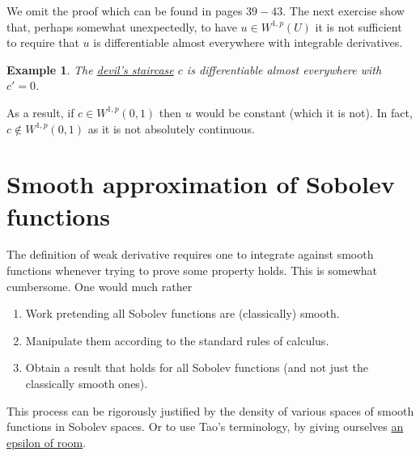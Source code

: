 \documentclass[12pt]{article}
\newtheorem{example}{Example}
\theoremstyle{remark}
\begin{document}
We omit the proof which can be found in \cite{Juha} pages $39-43$. The next exercise show that, perhaps somewhat unexpectedly, to have $u \in  W^{1,p}(U)$ it is not sufficient to require that $u$ is differentiable almost everywhere with integrable derivatives.
\begin{example}
	The \href{https://en.wikipedia.org/wiki/Cantor_function}{devil's staircase} $c$ is differentiable almost everywhere with $c'=0$. \end{example}
As a result, if $c \in W^{1,p}(0,1)$ then $u$ would be constant (which it is not). In fact, $c \not\in W^{1,p}(0,1)$ as it is not absolutely continuous.




\section{Smooth approximation of Sobolev functions}
The definition of weak derivative requires one to integrate against smooth functions whenever trying to prove some property holds. This is somewhat cumbersome. One would much rather
\begin{enumerate}
	\item Work pretending all Sobolev functions are (classically) smooth.
	\item Manipulate them according to the standard rules of calculus.
	\item Obtain a result that holds for all Sobolev functions (and not just the classically smooth ones).\end{enumerate}
This process can be rigorously justified by the density of various spaces of smooth functions in Sobolev spaces. Or to use Tao's terminology, by giving ourselves \href{https://terrytao.wordpress.com/2009/02/28/tricks-wiki-give-yourself-an-epsilon-of-room/}{an epsilon of room}.
\end{document}
